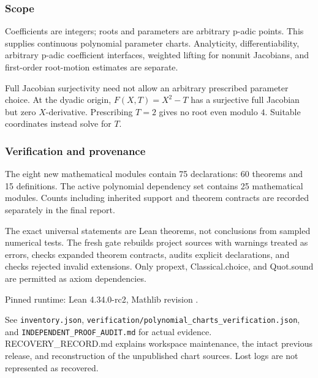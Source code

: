\hypertarget{cont5:scope}{%
\subsubsection{Scope}\label{cont5:scope}}

Coefficients are integers; roots and parameters are arbitrary p-adic
points. This supplies continuous polynomial parameter charts.
Analyticity, differentiability, arbitrary p-adic coefficient interfaces,
weighted lifting for nonunit Jacobians, and first-order root-motion
estimates are separate.

Full Jacobian surjectivity need not allow an arbitrary prescribed
parameter choice. At the dyadic origin, \(F(X,T)=X^2-T\) has a
surjective full Jacobian but zero \(X\)-derivative. Prescribing \(T=2\)
gives no root even modulo \(4\). Suitable coordinates instead solve for
\(T\).

\hypertarget{cont5:verification-and-provenance}{%
\subsubsection{Verification and
provenance}\label{cont5:verification-and-provenance}}

The eight new mathematical modules contain 75 declarations: 60 theorems
and 15 definitions. The active polynomial dependency set contains 25
mathematical modules. Counts including inherited support and theorem
contracts are recorded separately in the final report.

The exact universal statements are Lean theorems, not conclusions from
sampled numerical tests. The fresh gate rebuilds project sources with
warnings treated as errors, checks expanded theorem contracts, audits
explicit declarations, and checks rejected invalid extensions. Only
propext, Classical.choice, and Quot.sound are permitted as axiom
dependencies.

Pinned runtime: Lean 4.34.0-rc2, Mathlib revision
.

See \nolinkurl{inventory.json}, \nolinkurl{verification/polynomial_charts_verification.json},
and \nolinkurl{INDEPENDENT_PROOF_AUDIT.md} for actual evidence.
RECOVERY\_RECORD.md explains workspace maintenance, the intact previous
release, and reconstruction of the unpublished chart sources. Lost logs
are not represented as recovered.
